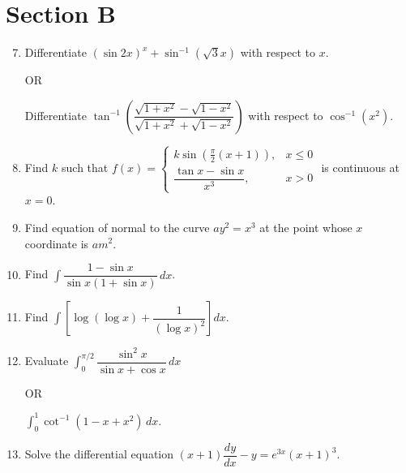 \documentclass[12pt]{article}
\begin{document}
\section*{Section B}

\begin{enumerate}
\setcounter{enumi}{6}
\item Differentiate $(\sin 2x)^x + \sin^{-1}(\sqrt{3}x)$ with respect to $x$.    

OR    

Differentiate $\tan^{-1}\left(\dfrac{\sqrt{1+x^2}-\sqrt{1-x^2}}{\sqrt{1+x^2}+\sqrt{1-x^2}}\right)$ with respect to $\cos^{-1}(x^2)$.  

\item Find $k$ such that $f(x)=\begin{cases}   
k\sin\left(\tfrac{\pi}{2}(x+1)\right), & x\leq 0 \\   
\dfrac{\tan x-\sin x}{x^3}, & x>0   
\end{cases}$ is continuous at $x=0$.  

\item Find equation of normal to the curve $ay^2=x^3$ at the point whose $x$ coordinate is $am^2$.  

\item Find $\int \dfrac{1-\sin x}{\sin x(1+\sin x)} \, dx$.  

\item Find $\int \left[\log(\log x)+\dfrac{1}{(\log x)^2}\right] dx$.  

\item Evaluate $\int_{0}^{\pi/2} \dfrac{\sin^2 x}{\sin x + \cos x} \, dx$    

OR    

$\int_{0}^{1} \cot^{-1}(1-x+x^2) \, dx$.  

\item Solve the differential equation $(x+1)\dfrac{dy}{dx} - y = e^{3x}(x+1)^3$.

\end{enumerate}
\end{document}
